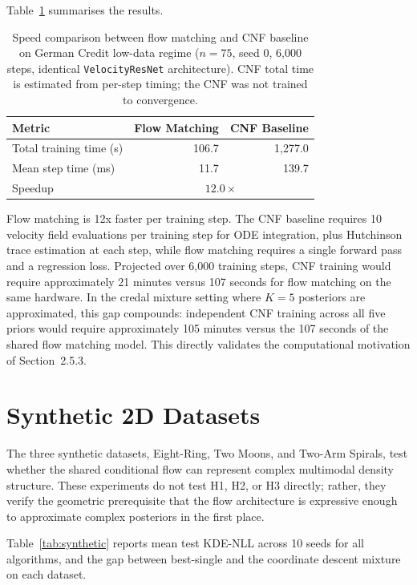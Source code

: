 Table~\ref{tab:speed_comparison} 
summarises the results.

\begin{table}[h]
\centering
\caption{Speed comparison between flow 
matching and CNF baseline on German Credit 
low-data regime ($n = 75$, seed 0, 
6{,}000 steps, identical 
\texttt{VelocityResNet} architecture). 
CNF total time is estimated from per-step 
timing; the CNF was not trained to 
convergence.}
\label{tab:speed_comparison}
{\singlespacing
\begin{tabular}{lrr}
\hline
Metric & Flow Matching & CNF Baseline \\
\hline
Total training time (s) & 106.7 & 1{,}277.0 \\
Mean step time (ms) & 11.7 & 139.7 \\
Speedup & \multicolumn{2}{c}{$12.0\times$} \\
\hline
\end{tabular}}
\end{table}

Flow matching is 12x faster per training 
step. The CNF baseline requires 10 
velocity field evaluations per training 
step for ODE integration, plus Hutchinson 
trace estimation at each step, while flow 
matching requires a single forward pass 
and a regression loss. Projected over 
6{,}000 training steps, CNF training 
would require approximately 21 minutes 
versus 107 seconds for flow matching on 
the same hardware. In the credal mixture 
setting where $K = 5$ posteriors are 
approximated, this gap compounds: 
independent CNF training across all 
five priors would require approximately 
105 minutes versus the 107 seconds of 
the shared flow matching model. This 
directly validates the computational 
motivation of Section~2.5.3.

\section{Synthetic 2D Datasets}
\label{sec:synthetic}

The three synthetic datasets, 
Eight-Ring, Two Moons, and Two-Arm 
Spirals, test whether the shared 
conditional flow can represent complex 
multimodal density structure. These 
experiments do not test H1, H2, or 
H3 directly; rather, they verify the 
geometric prerequisite that the flow 
architecture is expressive enough to 
approximate complex posteriors in 
the first place.

Table~\ref{tab:synthetic} reports 
mean test KDE-NLL across 10 seeds 
for all algorithms, and the gap 
between best-single and the 
coordinate descent mixture on each 
dataset.

